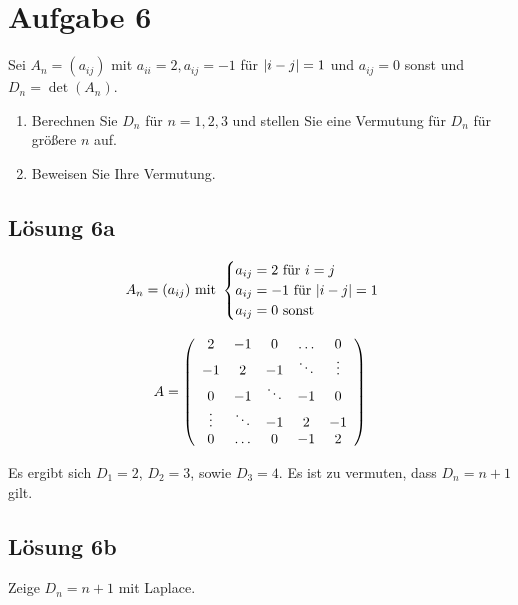 \documentclass[main.tex]{subfiles}
\begin{document}
\section{Aufgabe 6}
Sei $A_n=(a_{ij})$ mit $a_{ii} = 2, a_{ij} = -1$ für $\abs{i-j} = 1$ und $a_{ij} = 0$ sonst und $D_n = \det(A_n)$.
\begin{enumerate}
    \item Berechnen Sie $D_n$ für $n= 1, 2, 3$ und stellen Sie eine Vermutung für $D_n$ für größere $n$ auf.
    \item Beweisen Sie Ihre Vermutung.
\end{enumerate}

\subsection{Lösung 6a}

$$
    A_n =
            (a_{ij}) \text{ mit } \begin{cases}
                a_{ij} = 2 \text{ für } i = j \\
                a_{ij} = -1 \text{ für } \abs{i -j} = 1 \\
                a_{ij} = 0 \text { sonst}
            \end{cases}
$$

\begin{align*}
    A = \eqmatrix{ccccc}{
              2 &    -1 & 0 & \dots  & 0 \\
             -1 &     2 & -1 & \ddots & \vdots \\
              0 &    -1 & \ddots & -1 & 0 \\
         \vdots & \ddots & -1 & 2 & -1 \\
              0 & \dots & 0 & -1  & 2 \\
    }
\end{align*}

Es ergibt sich $D_1 = 2$, $D_2 = 3$, sowie $D_3 = 4$.
Es ist zu vermuten, dass $D_n = n+1$ gilt.

\subsection{Lösung 6b}
Zeige $D_n = n+1$ mit Laplace.
\end{document}
